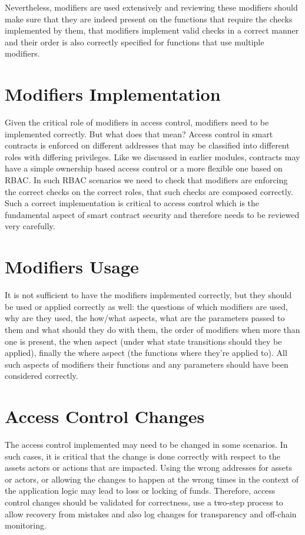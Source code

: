 Nevertheless, modifiers are used extensively and reviewing these modifiers should make sure that they are indeed present on the functions that require the checks implemented by them, that modifiers implement valid checks in a correct manner and their order is also correctly specified for functions that use multiple modifiers.

\section{Modifiers Implementation}
Given the critical role of modifiers in access control, modifiers need to be implemented correctly. But what does that mean? Access control in smart contracts is enforced on different addresses that may be classified into different roles with differing privileges. Like we discussed in earlier modules, contracts may have a simple ownership based access control or a more flexible one based on RBAC. In such RBAC scenarios we need to check that modifiers are enforcing the correct checks on the correct roles, that such checks are composed correctly. Such a correct implementation is critical to access control which is the fundamental aspect of smart contract security and therefore needs to be reviewed very carefully.

\section{Modifiers Usage}
It is not sufficient to have the modifiers implemented correctly, but they should be used or applied correctly as well: the questions of which modifiers are used, why are they used, the how/what aspects, what are the parameters passed to them and what should they do with them, the order of modifiers when more than one is present, the when aspect (under what state transitions should they be applied), finally the where aspect (the functions where they're applied to). All such aspects of modifiers their functions and any parameters should have been considered correctly.

\section{Access Control Changes}
The access control implemented may need to be changed in some scenarios. In such cases, it is critical that the change is done correctly with respect to the assets actors or actions that are impacted. Using the wrong addresses for assets or actors, or allowing the changes to happen at the wrong times in the context of the application logic may lead to loss or locking of funds. Therefore, access control changes should be validated for correctness, use a two-step process to allow recovery from mistakes and also log changes for transparency and off-chain monitoring.


